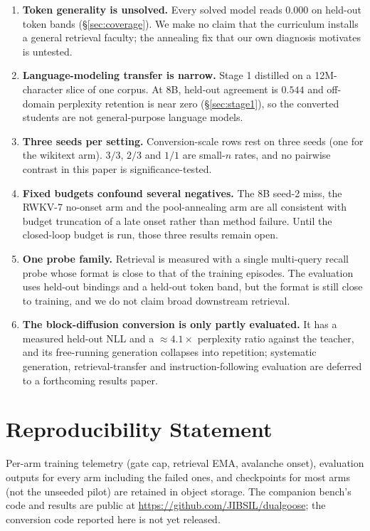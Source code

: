 \documentclass{article}
\begin{document}
\begin{enumerate}[leftmargin=1.4em,itemsep=2pt]
\item \textbf{Token generality is unsolved.} Every solved model reads $0.000$ on held-out token bands (\S\ref{sec:coverage}). We make no claim that the curriculum installs a general retrieval faculty; the annealing fix that our own diagnosis motivates is untested.
\item \textbf{Language-modeling transfer is narrow.} Stage 1 distilled on a 12M-character slice of one corpus. At $8$B, held-out agreement is $0.544$ and off-domain perplexity retention is near zero (\S\ref{sec:stage1}), so the converted students are not general-purpose language models.
\item \textbf{Three seeds per setting.} Conversion-scale rows rest on three seeds (one for the wikitext arm). $3/3$, $2/3$ and $1/1$ are small-$n$ rates, and no pairwise contrast in this paper is significance-tested.
\item \textbf{Fixed budgets confound several negatives.} The $8$B seed-2 miss, the RWKV-7 no-onset arm and the pool-annealing arm are all consistent with budget truncation of a late onset rather than method failure. Until the closed-loop budget is run, those three results remain open.
\item \textbf{One probe family.} Retrieval is measured with a single multi-query recall probe whose format is close to that of the training episodes. The evaluation uses held-out bindings and a held-out token band, but the format is still close to training, and we do not claim broad downstream retrieval.
\item \textbf{The block-diffusion conversion is only partly evaluated.} It has a measured held-out NLL and a ${\approx}4.1\times$ perplexity ratio against the teacher, and its free-running generation collapses into repetition; systematic generation, retrieval-transfer and instruction-following evaluation are deferred to a forthcoming results paper.
\end{enumerate}


\section*{Reproducibility Statement}
Per-arm training telemetry (gate cap, retrieval EMA, avalanche onset), evaluation outputs for every arm including the failed ones, and checkpoints for most arms (not the unseeded pilot) are retained in object storage. The companion bench's code and results are public at \url{https://github.com/JIBSIL/dualgoose}; the conversion code reported here is not yet released.
\end{document}
